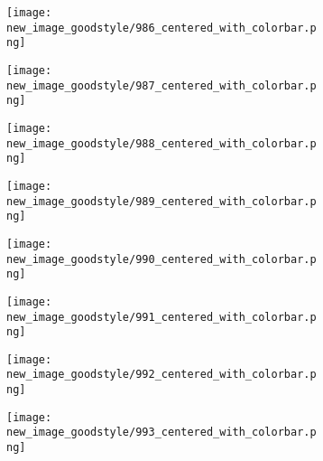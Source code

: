 \documentclass[a4paper,12pt]{article}
\begin{document}
\begin{figure}[H]
  \begin{subfigure}{0.11\textwidth}
    \texttt{[image: new\_image\_goodstyle/986\_centered\_with\_colorbar.png]}
  \end{subfigure}
  \hfill
  \begin{subfigure}{0.11\textwidth}
    \texttt{[image: new\_image\_goodstyle/987\_centered\_with\_colorbar.png]}
  \end{subfigure}
  \hfill
  \begin{subfigure}{0.11\textwidth}
    \texttt{[image: new\_image\_goodstyle/988\_centered\_with\_colorbar.png]}
  \end{subfigure}
  \hfill
  \begin{subfigure}{0.11\textwidth}
    \texttt{[image: new\_image\_goodstyle/989\_centered\_with\_colorbar.png]}
  \end{subfigure}
  \hfill
  \begin{subfigure}{0.11\textwidth}
    \texttt{[image: new\_image\_goodstyle/990\_centered\_with\_colorbar.png]}
  \end{subfigure}
  \hfill
  \begin{subfigure}{0.11\textwidth}
    \texttt{[image: new\_image\_goodstyle/991\_centered\_with\_colorbar.png]}
  \end{subfigure}
  \hfill
  \begin{subfigure}{0.11\textwidth}
    \texttt{[image: new\_image\_goodstyle/992\_centered\_with\_colorbar.png]}
  \end{subfigure}
  \hfill
  \begin{subfigure}{0.11\textwidth}
    \texttt{[image: new\_image\_goodstyle/993\_centered\_with\_colorbar.png]}
  \end{subfigure}
  \hfill
\end{figure}
\end{document}
